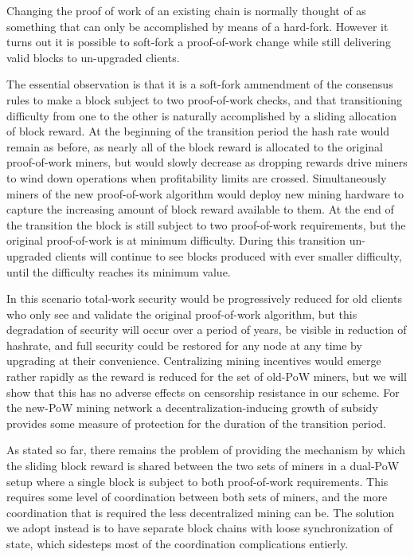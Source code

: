 Changing the proof of work of an existing chain is normally thought of
as something that can only be accomplished by means of a hard-fork.
However it turns out it is possible to soft-fork a proof-of-work
change while still delivering valid blocks to un-upgraded clients.

The essential observation is that it is a soft-fork ammendment of the
consensus rules to make a block subject to two proof-of-work checks,
and that transitioning difficulty from one to the other is naturally
accomplished by a sliding allocation of block reward.  At the
beginning of the transition period the hash rate would remain as
before, as nearly all of the block reward is allocated to the original
proof-of-work miners, but would slowly decrease as dropping rewards
drive miners to wind down operations when profitability limits are
crossed.  Simultaneously miners of the new proof-of-work algorithm
would deploy new mining hardware to capture the increasing amount of
block reward available to them.  At the end of the transition the
block is still subject to two proof-of-work requirements, but the
original proof-of-work is at minimum difficulty.  During this
transition un-upgraded clients will continue to see blocks produced
with ever smaller difficulty, until the difficulty reaches its minimum
value.

In this scenario total-work security would be progressively reduced
for old clients who only see and validate the original proof-of-work
algorithm, but this degradation of security will occur over a period
of years, be visible in reduction of hashrate, and full security could
be restored for any node at any time by upgrading at their
convenience.  Centralizing mining incentives would emerge rather
rapidly as the reward is reduced for the set of old-PoW miners, but we
will show that this has no adverse effects on censorship resistance in
our scheme.  For the new-PoW mining network a
decentralization-inducing growth of subsidy provides some measure of
protection for the duration of the transition period.

As stated so far, there remains the problem of providing the mechanism
by which the sliding block reward is shared between the two sets of
miners in a dual-PoW setup where a single block is subject to both
proof-of-work requirements.  This requires some level of coordination
between both sets of miners, and the more coordination that is
required the less decentralized mining can be.  The solution we adopt
instead is to have separate block chains with loose synchronization of
state, which sidesteps most of the coordination complications
entierly.

